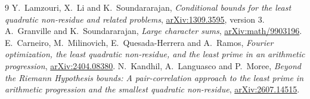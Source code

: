 \documentclass[11pt]{article}
\begin{document}
\begin{thebibliography}{9}\small
{} Y.~Lamzouri, X.~Li and K.~Soundararajan,
\emph{Conditional bounds for the least quadratic non-residue and related problems},
\href{https://arxiv.org/abs/1309.3595}{arXiv:1309.3595}, version 3.
 A.~Granville and K.~Soundararajan, \emph{Large character sums},
\href{https://arxiv.org/abs/math/9903196}{arXiv:math/9903196}.
 E.~Carneiro, M.~Milinovich, E.~Quesada-Herrera and
A.~Ramos, \emph{Fourier optimization, the least quadratic non-residue,
and the least prime in an arithmetic progression},
\href{https://arxiv.org/abs/2404.08380}{arXiv:2404.08380}.
 N.~Kandhil, A.~Languasco and P.~Moree,
\emph{Beyond the Riemann Hypothesis bounds: A pair-correlation approach to
the least prime in arithmetic progression and the smallest quadratic non-residue},
\href{https://arxiv.org/abs/2607.14515}{arXiv:2607.14515}.
\end{thebibliography}
\end{document}
